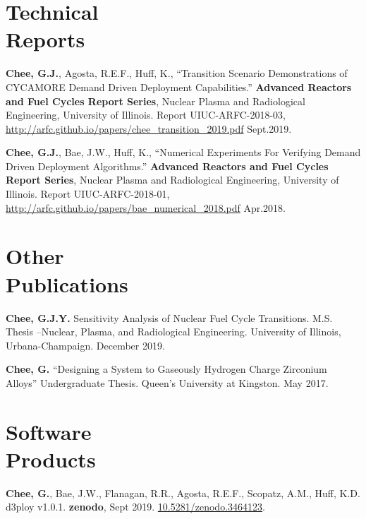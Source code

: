 \documentclass[margin,line]{resume}
\begin{document}
\begin{resume}
    \section{\mysidestyle Technical\\Reports}
    \begin{bibenum} 
        \item \textbf{Chee, G.J.}, Agosta, R.E.F., Huff, K., ``Transition Scenario Demonstrations of CYCAMORE Demand Driven Deployment Capabilities.'' 
        \textbf{Advanced Reactors and Fuel Cycles Report Series}, Nuclear Plasma and Radiological Engineering, University of Illinois.  Report 
        UIUC-ARFC-2018-03, 
        \url{http://arfc.github.io/papers/chee_transition_2019.pdf} 
        Sept.2019.  
      \item \textbf{Chee, G.J.}, Bae, J.W., Huff, K., ``Numerical Experiments 
              For Verifying Demand Driven Deployment Algorithms.'' 
              \textbf{Advanced Reactors and Fuel Cycles Report Series}, Nuclear Plasma and Radiological Engineering, University of Illinois.  Report 
              UIUC-ARFC-2018-01, 
              \url{http://arfc.github.io/papers/bae_numerical_2018.pdf} 
              Apr.2018.  
    \end{bibenum}
    \section{\mysidestyle Other\\Publications}
    \begin{bibenum}
      \item \textbf{Chee, G.J.Y.} Sensitivity Analysis of Nuclear Fuel Cycle Transitions. 
        M.S. Thesis --Nuclear, Plasma, and Radiological Engineering.
        University of Illinois, Urbana-Champaign.  December 2019.
      \item \textbf{Chee, G.} ``Designing a System to Gaseously Hydrogen Charge Zirconium Alloys''
        Undergraduate Thesis. Queen's University at Kingston. May 2017.
    \end{bibenum}
    \section{\mysidestyle Software\\Products}
    \begin{bibenum}
    \item \textbf{Chee, G.}, Bae, J.W., Flanagan, R.R., Agosta, R.E.F., Scopatz, A.M.,
    Huff, K.D. d3ploy v1.0.1. \textbf{zenodo}, Sept 2019. 
            \url{10.5281/zenodo.3464123}.
    \end{bibenum}


\end{resume}
\end{document}
